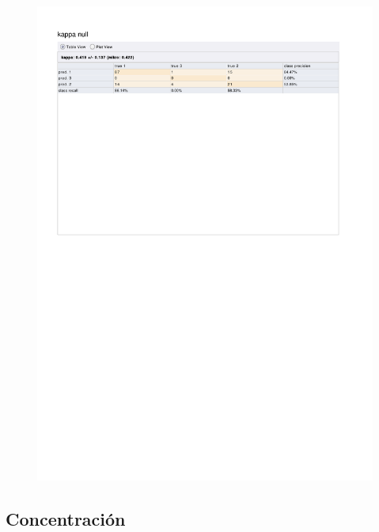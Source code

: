 \begin{figure}[htp]
  \centerline{\includegraphics[trim=0 680 0 80,clip,width=16.09cm]{results/ANN_K_Excitement.pdf}} \caption{
} \label{ANN_K_Excitement}
\end{figure}

\clearpage
\FloatBarrier
\subsection{Concentración}

